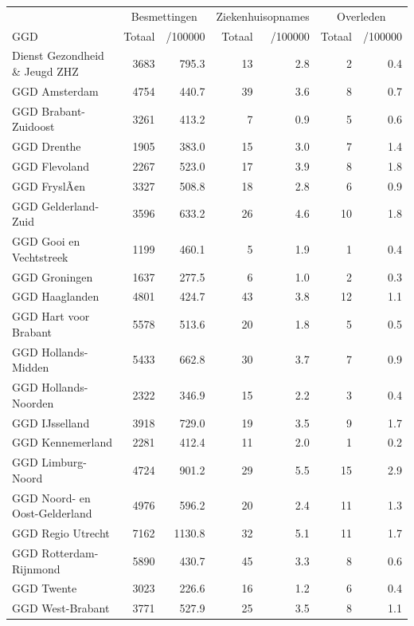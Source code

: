 \documentclass[
  english,
  man,floatsintext]{apa6}
\begin{document}
\begin{table}
\centering\begingroup\fontsize{10}{12}\selectfont

\begin{threeparttable}
\begin{tabular}{lrrrrrr}
\toprule
\multicolumn{1}{c}{ } & \multicolumn{2}{c}{Besmettingen} & \multicolumn{2}{c}{Ziekenhuisopnames} & \multicolumn{2}{c}{Overleden} \\
\cmidrule(l{3pt}r{3pt}){2-3} \cmidrule(l{3pt}r{3pt}){4-5} \cmidrule(l{3pt}r{3pt}){6-7}
GGD & Totaal & /100000 & Totaal & /100000 & Totaal & /100000\\
\midrule
Dienst Gezondheid \& Jeugd ZHZ & 3683 & 795.3 & 13 & 2.8 & 2 & 0.4\\
GGD Amsterdam & 4754 & 440.7 & 39 & 3.6 & 8 & 0.7\\
GGD Brabant-Zuidoost & 3261 & 413.2 & 7 & 0.9 & 5 & 0.6\\
GGD Drenthe & 1905 & 383.0 & 15 & 3.0 & 7 & 1.4\\
GGD Flevoland & 2267 & 523.0 & 17 & 3.9 & 8 & 1.8\\
GGD FryslÃ¢n & 3327 & 508.8 & 18 & 2.8 & 6 & 0.9\\
GGD Gelderland-Zuid & 3596 & 633.2 & 26 & 4.6 & 10 & 1.8\\
GGD Gooi en Vechtstreek & 1199 & 460.1 & 5 & 1.9 & 1 & 0.4\\
GGD Groningen & 1637 & 277.5 & 6 & 1.0 & 2 & 0.3\\
GGD Haaglanden & 4801 & 424.7 & 43 & 3.8 & 12 & 1.1\\
GGD Hart voor Brabant & 5578 & 513.6 & 20 & 1.8 & 5 & 0.5\\
GGD Hollands-Midden & 5433 & 662.8 & 30 & 3.7 & 7 & 0.9\\
GGD Hollands-Noorden & 2322 & 346.9 & 15 & 2.2 & 3 & 0.4\\
GGD IJsselland & 3918 & 729.0 & 19 & 3.5 & 9 & 1.7\\
GGD Kennemerland & 2281 & 412.4 & 11 & 2.0 & 1 & 0.2\\
GGD Limburg-Noord & 4724 & 901.2 & 29 & 5.5 & 15 & 2.9\\
GGD Noord- en Oost-Gelderland & 4976 & 596.2 & 20 & 2.4 & 11 & 1.3\\
GGD Regio Utrecht & 7162 & 1130.8 & 32 & 5.1 & 11 & 1.7\\
GGD Rotterdam-Rijnmond & 5890 & 430.7 & 45 & 3.3 & 8 & 0.6\\
GGD Twente & 3023 & 226.6 & 16 & 1.2 & 6 & 0.4\\
GGD West-Brabant & 3771 & 527.9 & 25 & 3.5 & 8 & 1.1\\

\end{tabular}
\end{threeparttable}
\end{table}
\end{document}
